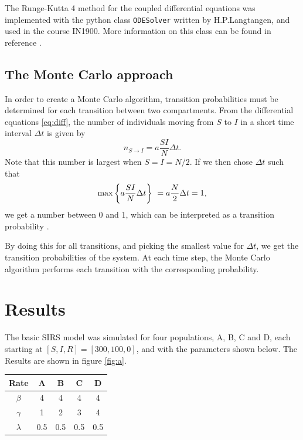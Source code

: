 \documentclass[a4paper,10pt,twocolumn]{article}
\begin{document}
The Runge-Kutta 4 method for the coupled differential equations was implemented with the python class \texttt{ODESolver} written by H.P.Langtangen, and used in the course IN1900. More information on this class can be found in reference \cite{in1900}. 

\subsection{The Monte Carlo approach}

In order to create a Monte Carlo algorithm, transition probabilities must be determined for each transition between two compartments. 
From the differential equations \ref{eq:diff}, the number of individuals moving from $S$ to $I$ in a short time interval $\Delta t$ is given by
\[
n_{S\to I} = a\frac{SI}{N}\Delta t.
\]  
Note that this number is largest when $S=I=N/2$. If we then chose $\Delta t$ such that
\[
\max\qty{a\frac{SI}{N}\Delta t} = a\frac{N}{2}\Delta t = 1,
\]
we get a number between 0 and 1, which can be interpreted as a transition probability \cite{labtext}. 

By doing this for all transitions, and picking the smallest value for $\Delta t$, we get the transition probabilities of the system. 
At each time step, the Monte Carlo algorithm performs each transition with the corresponding probability. 


%
%
%
\section{Results}

The basic SIRS model was simulated for four populations, A, B, C and D, each starting at $[S,I,R]=[300,100,0]$, and with the parameters shown below. The Results are shown in figure \ref{fig:a}. 
\begin{center}
	\begin{tabular}{ccccc}\hline
	\bf Rate & \bf A & \bf B & \bf C & \bf D \\\hline
	$\beta$ & 4 & 4 & 4 & 4 \\
	$\gamma$ & 1 & 2 & 3 & 4 \\
	$\lambda$ & 0.5 & 0.5 & 0.5 & 0.5 \\\hline
	\end{tabular}
\end{center}

\end{document}
